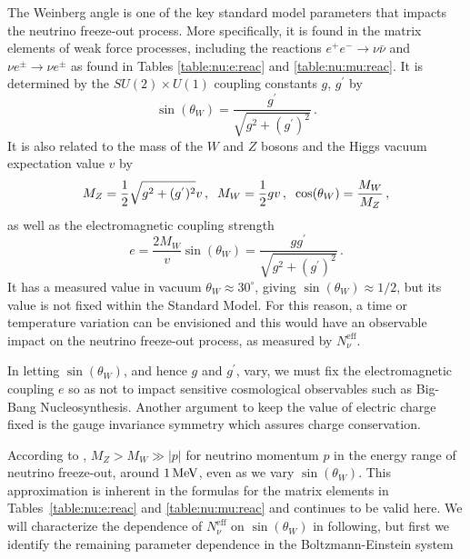 The Weinberg angle is one of the key standard model parameters that impacts the neutrino freeze-out process. More specifically, it is found in the matrix elements of weak force processes, including the reactions $e^+e^-\rightarrow \nu\bar\nu$ and $\nu e^\pm\rightarrow \nu e^\pm$ as found in Tables \ref{table:nu:e:reac} and \ref{table:nu:mu:reac}. It is determined by the $SU(2)\times U(1)$ coupling constants $g$, $g^{'}$ by
\begin{equation}
\sin(\theta_W)=\frac{g^{'}}{\sqrt{g^2+(g^{'})^2}}\,.
\end{equation}
It is also related to the mass of the $W$ and $Z$ bosons and the Higgs vacuum expectation value $v$ by
\begin{equation}\label{eq:MWMZ}
M_Z=\frac{1}{2}\sqrt{g^2+(g^{'})^2}v\,,\hspace{2mm} M_W=\frac{1}{2}gv\,,\hspace{2mm} \cos(\theta_W)=\frac{M_W}{M_Z}\,,
\end{equation}
as well as the electromagnetic coupling strength
\begin{equation}\label{eq:egg}
e=\frac{2M_W}{v}\sin(\theta_W) =\frac{gg^{'}}{\sqrt{g^2+(g^{'})^2}}\,.
\end{equation}
It has a measured value in vacuum $\theta_W\approx 30^\circ$, giving $\sin(\theta_W)\approx 1/2$, but its value is not fixed within the Standard Model. For this reason, a time or temperature variation can be envisioned and this would have an observable impact on the neutrino freeze-out process, as measured by $N_\nu^{\mathrm{eff}}$.

In letting $\sin(\theta_W)$, and hence $g$ and $g^{'}$, vary, we must fix the electromagnetic coupling $e$ so as not to impact sensitive cosmological observables such as Big-Bang Nucleosynthesis. Another argument to keep the value of electric charge fixed is the gauge invariance symmetry which assures charge conservation. 

 According to , $M_Z>M_W\gg |p|$ for neutrino momentum $p$ in the energy range of neutrino freeze-out, around $1\text{\,MeV}$, even as we vary $\sin(\theta_W)$. This approximation is inherent in the formulas for the matrix elements in Tables~\ref{table:nu:e:reac} and \ref{table:nu:mu:reac} and continues to be valid here. We will characterize the dependence of $N_\nu^{\mathrm{eff}}$ on $\sin(\theta_W)$ in following, but first we identify the remaining parameter dependence in the Boltzmann-Einstein system

